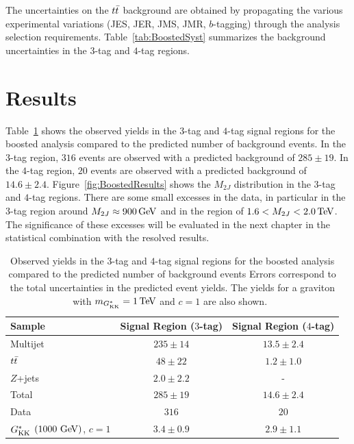 The uncertainties on the $t\bar{t}$ background are obtained by propagating the various experimental variations (JES, JER, JMS, JMR, $b$-tagging) through the analysis selection requirements. Table~\ref{tab:BoostedSyst} summarizes the background uncertainties in the $3$-tag and $4$-tag regions. 

\section{Results}

Table~\ref{tab:BoostedResults} shows the observed yields in the $3$-tag and $4$-tag signal regions for the boosted analysis compared to the predicted number of background events. In the $3$-tag region, $316$ events are observed with a predicted background of $285\pm19$. In the $4$-tag region, $20$ events are observed with a predicted background of $14.6\pm 2.4$. Figure~\ref{fig:BoostedResults} shows the $M_{2J}$ distribution in the $3$-tag and $4$-tag regions. There are some small excesses in the data, in particular in the $3$-tag region around $M_{2J} \approx 900 \GeV$ and in the region of $1.6 < M_{2J} < 2.0 \TeV$. The significance of these excesses will be evaluated in the next chapter in the statistical combination with the resolved results. 

\begin{table}[!htb]
\begin{center}
\begin{tabular}{ l c c }
\toprule
 Sample  & Signal Region ($3$-tag)    & Signal Region ($4$-tag) \\ 
\midrule
Multijet &  $235  \pm 14$       & $13.5 \pm 2.4$ \\
$t\bar{t}$   &  $48   \pm 22$       & $1.2  \pm 1.0$ \\
$Z$+jets &  $2.0  \pm 2.2$      &       -        \\
\midrule
Total    &  $285  \pm 19$       & $14.6 \pm 2.4$ \\
 \midrule
Data   &  $316$                 & $20$ \\
\midrule
$G^*_{\rm KK}$ $\left(1000\,\GeV{}\right)$, $c = 1$ & $3.4 \pm 0.9$  & $2.9 \pm 1.1$ \\
\bottomrule
\end{tabular}
\caption{Observed yields in the $3$-tag and $4$-tag signal regions for the boosted analysis compared to the predicted number of background events
  Errors correspond to the total uncertainties in the predicted event yields. The yields for a graviton with $m_{\Gkk} = 1\TeV$ and $c = 1$ are also shown.~\cite{4bconf}}
\label{tab:BoostedResults} 
\end{center}
\end{table}

